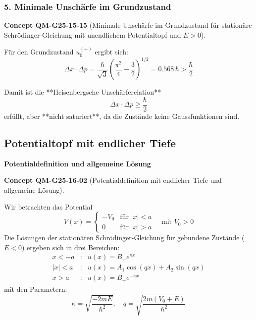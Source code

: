 \documentclass[10pt, letterpaper]{article}
\newcommand{\CustomHeading}[3]{%
  \par\medskip\noindent%
  \textbf{#1 #2} \textnormal{(#3)}.\enskip%
}
\newenvironment{CONC}[2]{\begin{unitbox}\CustomHeading{Concept}{#1}{#2}}{\end{unitbox}}
\begin{document}
\subsubsection*{5. Minimale Unschärfe im Grundzustand}

\begin{CONC}{QM-G25-15-15}{Minimale Unschärfe im Grundzustand für stationäre Schrödinger-Gleichung mit unendlichem Potentialtopf und $E>0$}
Für den Grundzustand \( u_0^{(+)} \) ergibt sich:
\[
\Delta x \cdot \Delta p = \frac{\hbar}{\sqrt{3}} \left( \frac{\pi^2}{4} - \frac{3}{2} \right)^{1/2}
= 0.568\, \hbar > \frac{\hbar}{2}
\]

Damit ist die **Heisenbergsche Unschärferelation**
\[
\Delta x \cdot \Delta p \geq \frac{\hbar}{2}
\]
erfüllt, aber **nicht saturiert**, da die Zustände keine Gaussfunktionen sind.
\end{CONC}







\pagebreak


\subsection{Potentialtopf mit endlicher Tiefe}




\textbf{Potentialdefinition und allgemeine Lösung}



\begin{CONC}{QM-G25-16-02}{Potentialdefinition mit endlicher Tiefe und allgemeine Lösung}
Wir betrachten das Potential
\[
V(x) = \begin{cases}
    -V_0 & \text{für } |x| < a \\
    0    & \text{für } |x| > a
\end{cases}
\quad \text{mit } V_0 > 0
\]
Die Lösungen der stationären Schrödinger-Gleichung für gebundene Zustände ($E<0$) ergeben sich in drei Bereichen:
\[
\begin{array}{rll}
x < -a       & : & u(x) = B_- e^{\kappa x} \\
|x| < a      & : & u(x) = A_1 \cos(qx) + A_2 \sin(qx) \\
x > a        & : & u(x) = B_+ e^{-\kappa x}
\end{array}
\]
mit den Parametern:
\[
\kappa = \sqrt{\frac{-2mE}{\hbar^2}}, \quad q = \sqrt{\frac{2m(V_0 + E)}{\hbar^2}}
\]
\end{CONC}
\end{document}

